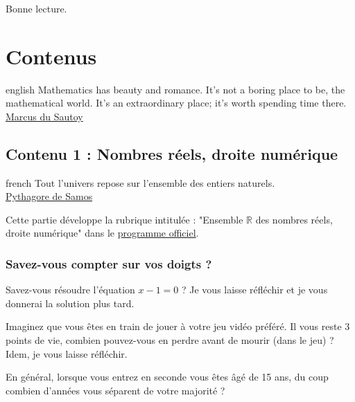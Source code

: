 \documentclass[a4paper, 11pt, twoside]{article}
\newcommand{\R}{\mathbb{R}}
\begin{document}
Bonne lecture.

\section{Contenus}
\label{sec:orgda3f058}
\begin{foreigndisplayquote}{english}
Mathematics has beauty and romance. It’s not a boring place to be,
the mathematical world. It’s an extraordinary place; it’s worth
spending time there.\\

\href{https://en.wikipedia.org/wiki/Marcus\_du\_Sautoy}{Marcus du Sautoy}
\end{foreigndisplayquote}

\startcontents[level-1]


\subsection{Contenu 1 : Nombres réels, droite numérique}
\label{sec:org9ec1b06}
\begin{foreigndisplayquote}{french}
Tout l'univers repose sur l'ensemble des entiers naturels.\\
\href{https://fr.wikipedia.org/wiki/Pythagore}{Pythagore de Samos}
\end{foreigndisplayquote}

\startcontents[level-2]


Cette partie développe la rubrique intitulée : "Ensemble \(\R\) des
nombres réels, droite numérique" dans le \href{https://eduscol.education.fr/document/24553/download}{programme officiel}.

\subsubsection{Savez-vous compter sur vos doigts ?}
\label{sec:org9e22842}

Savez-vous résoudre l'équation \(x - 1 = 0\) ? Je vous laisse
réfléchir et je vous donnerai la solution plus tard.

Imaginez que vous êtes en train de jouer à votre jeu vidéo
préféré. Il vous reste 3 points de vie, combien pouvez-vous en
perdre avant de mourir (dans le jeu) ? Idem, je vous laisse
réfléchir.

En général, lorsque vous entrez en seconde vous êtes âgé de 15 ans,
du coup combien d'années vous séparent de votre majorité ?
\end{document}
